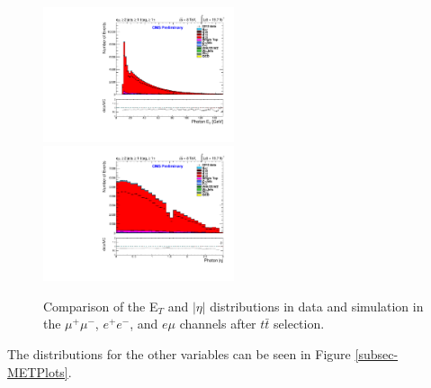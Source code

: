 \begin{figure}
\includegraphics[width=0.5\textwidth]{Plots/ControlPlots/TTbarDiLeptonAnalysis/EMu/Photons/AllPhotons/Photon_ET_splitTTbar_ratio.pdf}
\includegraphics[width=0.5\textwidth]{Plots/ControlPlots/TTbarDiLeptonAnalysis/EMu/Photons/AllPhotons/Photon_AbsEta_splitTTbar_ratio.pdf}
\caption{Comparison of the E$_{T}$ and $|\eta|$ distributions in data and simulation in the $\mu^{+}\mu^{-}$, $e^{+}e^{-}$, and $e\mu$ channels after $t\bar{t}$ selection.}
\label{fig-ttbarETandEta}
\end{figure}

The distributions for the other variables can be seen in Figure \ref{subsec-METPlots}.


